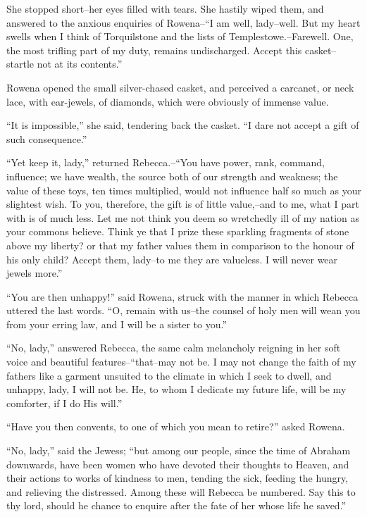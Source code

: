 She stopped short--her eyes filled with tears. She hastily wiped them,
and answered to the anxious enquiries of Rowena--``I am well,
lady--well. But my heart swells when I think of Torquilstone and the
lists of Templestowe.--Farewell. One, the most trifling part of my duty,
remains undischarged. Accept this casket--startle not at its contents.''

Rowena opened the small silver-chased casket, and perceived a carcanet,
or neck lace, with ear-jewels, of diamonds, which were obviously of
immense value.

``It is impossible,'' she said, tendering back the casket. ``I dare not
accept a gift of such consequence.''

``Yet keep it, lady,'' returned Rebecca.--``You have power, rank,
command, influence; we have wealth, the source both of our strength and
weakness; the value of these toys, ten times multiplied, would not
influence half so much as your slightest wish. To you, therefore, the
gift is of little value,--and to me, what I part with is of much less.
Let me not think you deem so wretchedly ill of my nation as your commons
believe. Think ye that I prize these sparkling fragments of stone above
my liberty? or that my father values them in comparison to the honour of
his only child? Accept them, lady--to me they are valueless. I will
never wear jewels more.''

``You are then unhappy!'' said Rowena, struck with the manner in which
Rebecca uttered the last words. ``O, remain with us--the counsel of holy
men will wean you from your erring law, and I will be a sister to you.''

``No, lady,'' answered Rebecca, the same calm melancholy reigning in her
soft voice and beautiful features--``that--may not be. I may not change
the faith of my fathers like a garment unsuited to the climate in which
I seek to dwell, and unhappy, lady, I will not be. He, to whom I
dedicate my future life, will be my comforter, if I do His will.''

``Have you then convents, to one of which you mean to retire?'' asked
Rowena.

``No, lady,'' said the Jewess; ``but among our people, since the time of
Abraham downwards, have been women who have devoted their thoughts to
Heaven, and their actions to works of kindness to men, tending the sick,
feeding the hungry, and relieving the distressed. Among these will
Rebecca be numbered. Say this to thy lord, should he chance to enquire
after the fate of her whose life he saved.''

